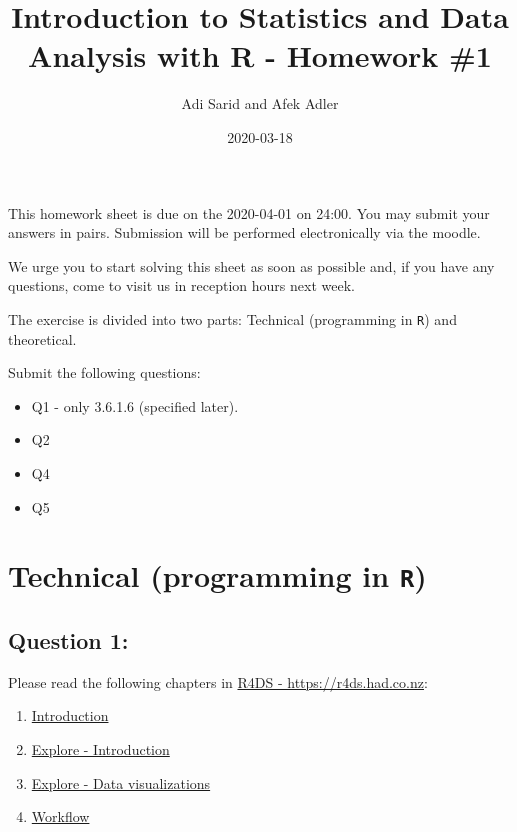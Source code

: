 \documentclass[
]{article}
\title{Introduction to Statistics and Data Analysis with R - Homework \#1}
\author{Adi Sarid and Afek Adler}
\date{2020-03-18}
\providecommand{\tightlist}{%
  \setlength{\itemsep}{0pt}\setlength{\parskip}{0pt}}
\begin{document}
\maketitle

This homework sheet is due on the 2020-04-01 on 24:00. You may submit
your answers in pairs. Submission will be performed electronically via
the moodle.

We urge you to start solving this sheet as soon as possible and, if you
have any questions, come to visit us in reception hours next week.

The exercise is divided into two parts: Technical (programming in
\texttt{R}) and theoretical.

Submit the following questions:

\begin{itemize}
\tightlist
\item
  Q1 - only 3.6.1.6 (specified later).
\item
  Q2
\item
  Q4
\item
  Q5
\end{itemize}

\hypertarget{technical-programming-in-r}{%
\section{\texorpdfstring{Technical (programming in
\texttt{R})}{Technical (programming in R)}}\label{technical-programming-in-r}}

\hypertarget{question-1}{%
\subsection{Question 1:}\label{question-1}}

Please read the following chapters in \href{https://r4ds.had.co.nz}{R4DS
- https://r4ds.had.co.nz}:

\begin{enumerate}
\def\labelenumi{\arabic{enumi}.}
\tightlist
\item
  \href{https://r4ds.had.co.nz/introduction.html}{Introduction}
\item
  \href{https://r4ds.had.co.nz/explore-intro.html}{Explore -
  Introduction}
\item
  \href{https://r4ds.had.co.nz/data-visualisation.html}{Explore - Data
  visualizations}
\item
  \href{https://r4ds.had.co.nz/workflow-basics.html}{Workflow}
\end{enumerate}
\end{document}

